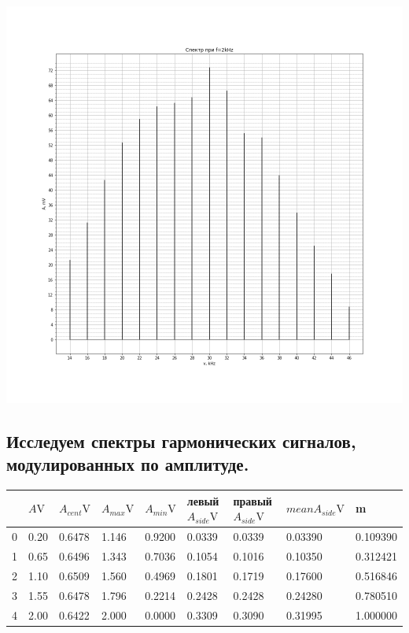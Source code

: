 \documentclass[12pt,a4paper]{article}
\begin{document}
\begin{center}
            \includegraphics[width=0.65\linewidth]{img/6.png}   
        \end{center}

        
        \subsection{Исследуем спектры гармонических сигналов, модулированных по амплитуде.}
        \begin{center}
            \begin{tabular}{|c|l|l|l|l|l|l|l|l|}
                \hline
                {} &     $A \si{\volt}$ &  $A_{cent} \si{\volt}$ &  $A_{max} \si{\volt}$ &   $A_{min} \si{\volt}$ &  левый $A_{side} \si{\volt}$ &  правый $A_{side} \si{\volt}$ &   $mean A_{side} \si{\volt}$ &         m \\
                \hline
                0 &  0.20 &  0.6478 &  1.146 &  0.9200 &   0.0339 &   0.0339 &  0.03390 &  0.109390 \\
                1 &  0.65 &  0.6496 &  1.343 &  0.7036 &   0.1054 &   0.1016 &  0.10350 &  0.312421 \\
                2 &  1.10 &  0.6509 &  1.560 &  0.4969 &   0.1801 &   0.1719 &  0.17600 &  0.516846 \\
                3 &  1.55 &  0.6478 &  1.796 &  0.2214 &   0.2428 &   0.2428 &  0.24280 &  0.780510 \\
                4 &  2.00 &  0.6422 &  2.000 &  0.0000 &   0.3309 &   0.3090 &  0.31995 &  1.000000 \\
                \hline
            \end{tabular}    
        \end{center}
        
\end{document}
